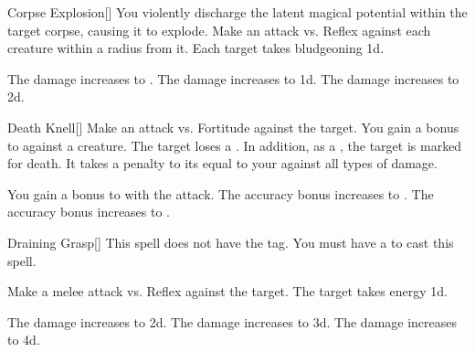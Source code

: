 \lowercase{\hypertarget{spell:Corpse Explosion}{}}\label{spell:Corpse Explosion}
\begin{freeability}[Rank 2]{\hypertarget{spell:Corpse Explosion}{Corpse Explosion}}[]
You violently discharge the latent magical potential within the target corpse, causing it to explode.
Make an attack vs. Reflex against each creature within a \areasmall radius from it.
\hit Each target takes bludgeoning  \minus1d.

\rankline
{} The damage increases to .
 The damage increases to  \plus1d.
 The damage increases to  \plus2d.
\end{freeability}
\vspace{0.25em}



\lowercase{\hypertarget{spell:Death Knell}{}}\label{spell:Death Knell}
\begin{freeability}[Rank 2]{\hypertarget{spell:Death Knell}{Death Knell}}[]
Make an attack vs. Fortitude against the target.
You gain a  bonus to  against a  creature.
\hit The target loses a .
In addition, as a , the target is marked for death.
It takes a penalty to its  equal to your  against all types of damage.

\rankline
{} You gain a  bonus to  with the attack.
 The accuracy bonus increases to .
 The accuracy bonus increases to .
\end{freeability}
\vspace{0.25em}



\lowercase{\hypertarget{spell:Draining Grasp}{}}\label{spell:Draining Grasp}
\begin{freeability}[Rank 2]{\hypertarget{spell:Draining Grasp}{Draining Grasp}}[]
This spell does not have the  tag.
You must have a  to cast this spell.

Make a melee attack vs. Reflex against the target.
\hit The target takes energy  \plus1d.

\rankline
{} The damage increases to  \plus2d.
 The damage increases to  \plus3d.
 The damage increases to  \plus4d.
\end{freeability}
\vspace{0.25em}



